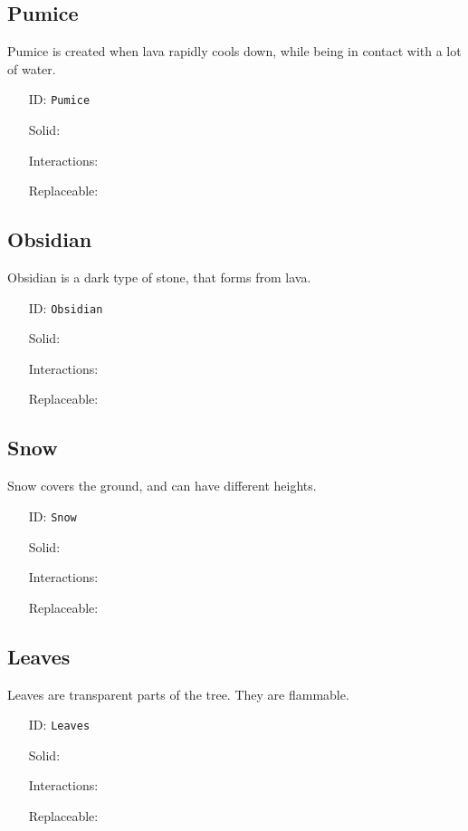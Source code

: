 \subsection{Pumice}\label{subsec:blocks_pumice}
Pumice is created when lava rapidly cools down, while being in contact with a lot of water.
\newline
\begin{itemize}[nosep]
    \item[ID:] \texttt{Pumice}
    \item[Solid:]  \Checkmark \item[Interactions:]  \XSolidBrush \item[Replaceable:]  \XSolidBrush
\end{itemize}

\subsection{Obsidian}\label{subsec:blocks_obsidian}
Obsidian is a dark type of stone, that forms from lava.
\newline
\begin{itemize}[nosep]
    \item[ID:] \texttt{Obsidian}
    \item[Solid:]  \Checkmark \item[Interactions:]  \XSolidBrush \item[Replaceable:]  \XSolidBrush
\end{itemize}

\subsection{Snow}\label{subsec:blocks_snow}
Snow covers the ground, and can have different heights.
\newline
\begin{itemize}[nosep]
    \item[ID:] \texttt{Snow}
    \item[Solid:]  \Checkmark \item[Interactions:]  \Checkmark \item[Replaceable:]  \XSolidBrush
\end{itemize}

\subsection{Leaves}\label{subsec:blocks_leaves}
Leaves are transparent parts of the tree. They are flammable.
\newline
\begin{itemize}[nosep]
    \item[ID:] \texttt{Leaves}
    \item[Solid:]  \Checkmark \item[Interactions:]  \XSolidBrush \item[Replaceable:]  \XSolidBrush
\end{itemize}


